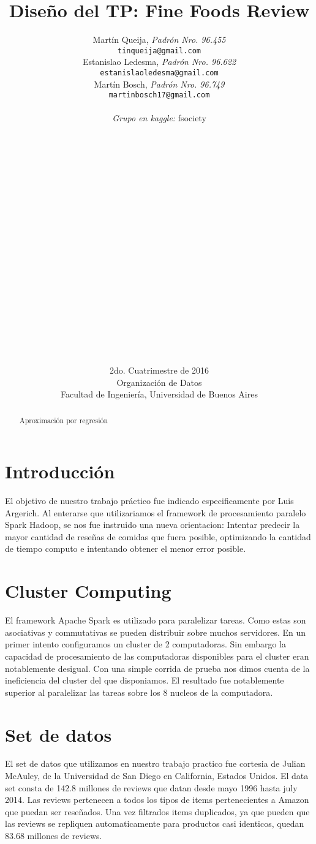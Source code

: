 \documentclass[a4paper,10pt]{article}
\title{	\textbf{Dise\~{n}o del TP: Fine Foods Review} }
\author{
    Mart\'{i}n Queija, \textit{Padr\'{o}n Nro. 96.455} \\
	\texttt{ tinqueija@gmail.com } \\[2.5ex]
	Estanislao Ledesma, \textit{Padr\'{o}n Nro. 96.622} \\
	\texttt{ estanislaoledesma@gmail.com } \\[2.5ex]
	Mart\'{i}n Bosch, \textit{Padr\'{o}n Nro. 96.749} \\
	\texttt{ martinbosch17@gmail.com } \\[2.5ex]
	\\
	\textit{Grupo en kaggle:} fsociety \\
	\\
	\\
	\\
	\\
	\\
	\\
	\\
	\\
	\\
	\\
	\\
	\\
	\\
	\\
	\\
	\\
	\\
	\\
	\\
	\\
	\normalsize{2do. Cuatrimestre de 2016} \\
	\normalsize{ Organizaci\'{o}n de Datos } \\
	\normalsize{ Facultad de Ingenier\'{i}a, Universidad de Buenos Aires } \\
}
\date{}
\begin{document}
	\maketitle
	\thispagestyle{empty}   %


	\begin{abstract}
		\centerline{Aproximaci\'{o}n por regresi\'{o}n}
		
	\end{abstract}
	\newpage
	
	\tableofcontents
	
	
	\section{Introducci\'{o}n}
	
	El objetivo de nuestro trabajo pr\'{a}ctico fue indicado especificamente por Luis Argerich. Al enterarse que utilizariamos el framework de procesamiento paralelo Spark Hadoop, se nos fue instruido una nueva orientacion: Intentar predecir la mayor cantidad de rese\~{n}as de comidas que fuera posible, optimizando la cantidad de tiempo computo e intentando obtener el menor error posible.
	
	\section{Cluster Computing}
	
	El framework Apache Spark es utilizado para paralelizar tareas. Como estas son asociativas y commutativas se pueden distribuir sobre muchos servidores. En un primer intento configuramos un cluster de 2 computadoras. Sin embargo la capacidad de procesamiento de las computadoras disponibles para el cluster eran notablemente desigual. Con una simple corrida de prueba nos dimos cuenta de la ineficiencia del cluster del que disponiamos. El resultado fue notablemente superior al paralelizar las tareas sobre los 8 nucleos de la computadora.
	
	\section{Set de datos}
	
	El set de datos que utilizamos en nuestro trabajo practico fue cortesia de Julian McAuley, de la Universidad de San Diego en California, Estados Unidos. El data set consta de 142.8 millones de reviews que datan desde mayo 1996 hasta july 2014. Las reviews pertenecen a todos los tipos de items pertenecientes a Amazon que puedan ser rese\~{n}ados. Una vez filtrados items duplicados, ya que pueden que las reviews se repliquen automaticamente para productos casi identicos, quedan 83.68 millones de reviews.
	
\end{document}
